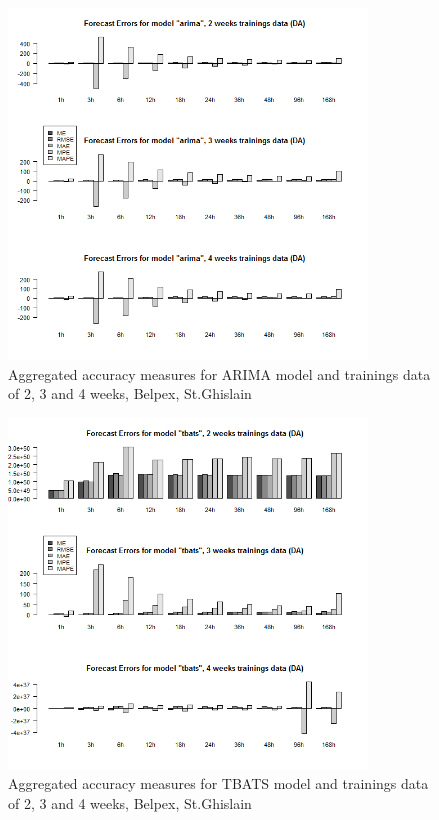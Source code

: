 \begin{figure}[!ht]
	\centering
		\includegraphics[width=0.85\textwidth]{figures/appendix_forecast_results/da_sim_2_x_1w_1w_arima.png}
	\caption{Aggregated accuracy measures for ARIMA model and trainings data of 2, 3 and 4 weeks, Belpex, St.Ghislain}
	\label{fig:app_da_sim_2_x_1w_1w_arima}
	\vspace*{-1.6in}
\end{figure}




\begin{figure}[!ht]
	\centering
		\includegraphics[width=0.85\textwidth]{figures/appendix_forecast_results/da_sim_2_x_1w_1w_tbats.png}
	\caption{Aggregated accuracy measures for TBATS model and trainings data of 2, 3 and 4 weeks, Belpex, St.Ghislain}
	\label{fig:app_da_sim_2_x_1w_1w_tbats}
\end{figure}




